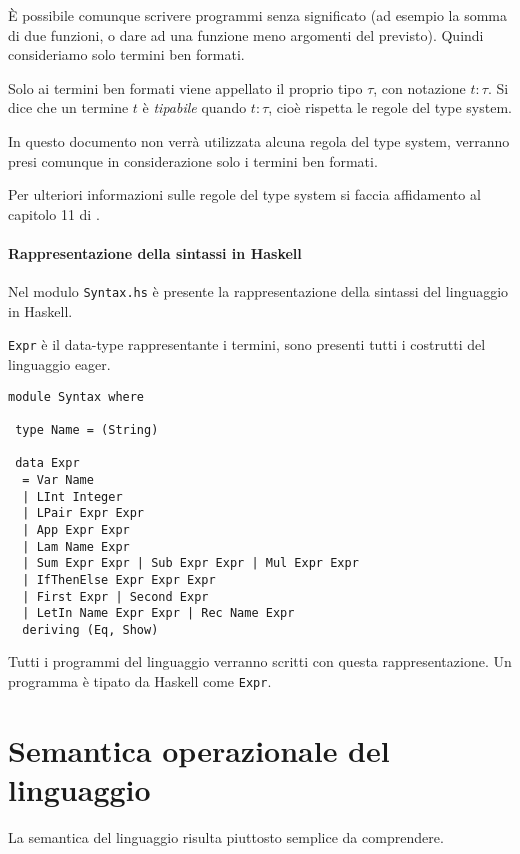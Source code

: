 \documentclass{article}
\begin{document}
È possibile comunque scrivere programmi senza significato (ad esempio la somma di due funzioni, o dare ad una funzione meno argomenti del previsto). Quindi consideriamo solo termini ben formati.

Solo ai termini ben formati viene appellato il proprio tipo $\tau$, con notazione $t: \tau$. Si dice che un termine $t$ è \emph{tipabile} quando $t : \tau $, cioè rispetta le regole del type system.

In questo documento non verrà utilizzata alcuna regola del type system, verranno presi comunque in considerazione solo i termini ben formati.

Per ulteriori informazioni sulle regole del type system si faccia affidamento al capitolo 11 di \cite{Winskel}.%

\paragraph{Rappresentazione della sintassi in Haskell}
Nel modulo \texttt{Syntax.hs} è presente la rappresentazione della sintassi del linguaggio in Haskell.

\texttt{Expr} è il data-type rappresentante i termini, sono presenti tutti i costrutti del linguaggio eager.

\begin{verbatim}
module Syntax where

 type Name = (String) 

 data Expr
  = Var Name
  | LInt Integer
  | LPair Expr Expr
  | App Expr Expr
  | Lam Name Expr
  | Sum Expr Expr | Sub Expr Expr | Mul Expr Expr
  | IfThenElse Expr Expr Expr
  | First Expr | Second Expr
  | LetIn Name Expr Expr | Rec Name Expr
  deriving (Eq, Show)

\end{verbatim}

Tutti i programmi del linguaggio verranno scritti con questa rappresentazione. Un programma è tipato da Haskell come \texttt{Expr}.

\section{Semantica operazionale del linguaggio}
\label{sec:operational}
La semantica del linguaggio risulta piuttosto semplice da comprendere.
\end{document}
